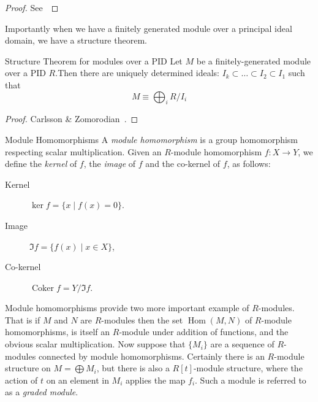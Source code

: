 \begin{proof}
See~\cite{caikm-ptafm-1997}
\end{proof}
Importantly when we have a finitely generated module over a principal ideal domain, we have a structure theorem. 
\begin{theorem}{Structure Theorem for modules over a PID}
Let $M$ be a finitely-generated module over a PID $R$.Then there are uniquely determined ideals:
$I_k \subset \ldots \subset I_2  \subset I_1$ 
such that
\[ M \equiv \bigoplus_i R/I_i \]
\end{theorem}
\begin{proof}
Carlsson \& Zomorodian~\cite{dummitnfoote}.
\end{proof}
\begin{definition}{Module Homomorphisms}
A \emph{module homomorphism} is a group homomorphism respecting scalar multiplication. Given an $R$-module homomorphism $f: X \rightarrow Y $, we define the \emph{kernel} of $f$, the \emph{image} of $f$ and the co-kernel of $f$, as follows: 
\begin{description}
\item[Kernel] $\ker{f} = \{ x \mid f(x) = 0 \}$. 
\item[Image] $\Im{f} = \{ f(x) \mid x \in X\}$, 
\item[Co-kernel] $\operatorname{Coker}{f} = Y/\Im{f}$.
\end{description}
\end{definition}

Module homomorphisms provide two more important example of $R$-modules. That is if $M$ and $N$ are $R$-modules then the set $\operatorname{Hom}(M,N)$ of $R$-module homomorphisms, is itself an $R$-module under addition of functions, and the obvious scalar multiplication. Now suppose that $\{M_i\}$ are a sequence of $R$-modules connected by module homomorphisms. Certainly there is an $R$-module structure on $M = \bigoplus M_i$, but there is also a $R[t]$-module structure, where the action of $t$ on an element in $M_i$ applies the map $f_i$. Such a module is referred to as a \emph{graded module}.

